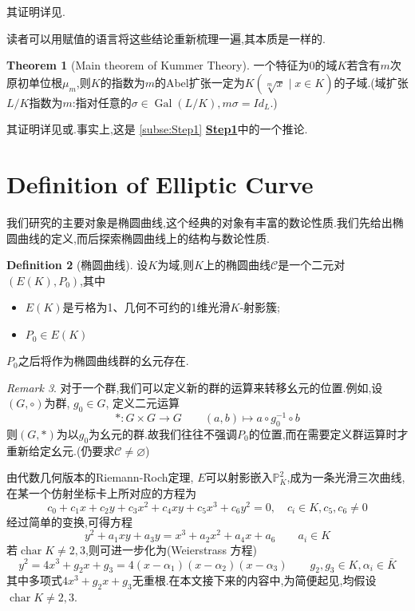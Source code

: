 \documentclass[12pt,A4paper,oneside,reqno]{amsart}
\numberwithin{equation}{section}
\theoremstyle{definition}
\newtheorem{theorem}{Theorem}[section]
\newtheorem{defn}[theorem]{Definition}
\theoremstyle{plain}
\theoremstyle{plain}
\numberwithin{equation}{section}
\theoremstyle{remark}
\newtheorem{remark}[theorem]{Remark}
\DeclareMathOperator{\cha}{\operatorname{char}}
\newcommand{\Gal}{\operatorname{Gal}}
\begin{document}
其证明详见\cite[p38, Proposition 3.4.4]{yichaolectures}.

读者可以用赋值的语言将这些结论重新梳理一遍,其本质是一样的.
\begin{theorem}[Main theorem of Kummer Theory]\label{thm:kummer}
	一个特征为0的域$K$若含有$m$次原初单位根$\mu_m$,则$K$的指数为$m$的Abel扩张一定为$K(\sqrt[m]{x} \mid x \in K)$的子域.(域扩张$L/K$指数为$m$:指对任意的$\sigma \in \Gal(L/K), m\sigma =Id_L$.)
		
	其证明详见\cite[p105, Theorem 11.4]{morandi2012field}或\cite[p816, Example]{dummit2004richard}.事实上,这是 \ref{subse:Step1} \textbf{\underline{Step1}}中的一个推论.
\end{theorem}
\section{Definition of Elliptic Curve}
我们研究的主要对象是椭圆曲线,这个经典的对象有丰富的数论性质.我们先给出椭圆曲线的定义,而后探索椭圆曲线上的结构与数论性质.
\begin{defn}[椭圆曲线]
	设$K$为域,则$K$上的椭圆曲线$\mathcal{C}$是一个二元对$(E(K),P_0)$,其中
	\begin{itemize}
		\item $E(K)$是亏格为1、几何不可约的1维光滑$K$-射影簇;
		\item $P_0 \in E(K)$
	\end{itemize}
$P_0$之后将作为椭圆曲线群的幺元存在.
\end{defn}
\begin{remark}
	对于一个群,我们可以定义新的群的运算来转移幺元的位置.例如,设$(G,\circ)$为群, $g_0 \in G$, 定义二元运算
	$$*\colon G \times G \longrightarrow G \qquad (a,b) \longmapsto a \circ g_0^{-1} \circ b$$
	则$(G,*)$为以$g_0$为幺元的群.故我们往往不强调$P_0$的位置,而在需要定义群运算时才重新给定幺元.(仍要求$\mathcal{C} \neq \varnothing$)
\end{remark}
由代数几何版本的Riemann-Roch定理, $E$可以射影嵌入$\mathbb{P}_K^2$,成为一条光滑三次曲线,在某一个仿射坐标卡上所对应的方程为
$$c_0+c_1x+c_2y+c_3x^2+c_4xy+c_5x^3+c_6y^2=0, \quad c_i \in K, c_5,c_6 \neq 0$$
经过简单的变换,可得方程
$$y^2+a_1xy+a_3y=x^3+a_2x^2+a_4x+a_6 \qquad a_i \in K$$
若$\cha K \neq 2,3$,则可进一步化为(Weierstrass 方程)
$$y^2=4x^3+g_2x+g_3=4(x-\alpha_1)(x-\alpha_2)(x-\alpha_3) \qquad g_2,g_3 \in K, \alpha_i \in \bar{K}$$
其中多项式$4x^3+g_2x+g_3$无重根.在本文接下来的内容中,为简便起见,均假设$\cha K \neq 2,3$.
\end{document}
